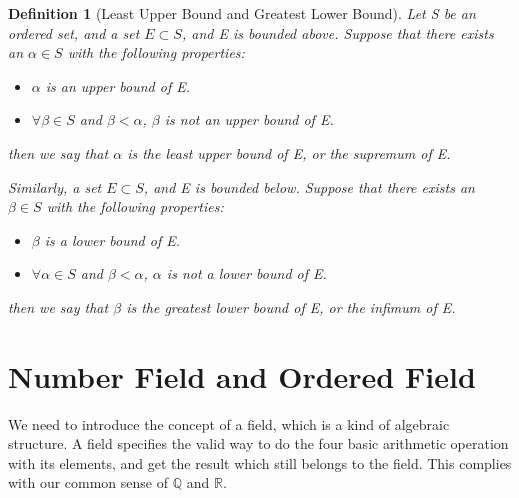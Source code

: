 \documentclass{article}
\newtheorem{definition}{Definition}[section]
\begin{document}
\begin{definition}[Least Upper Bound and Greatest Lower Bound]
  Let S be an ordered set, and a set $E \subset S$, and E is bounded above. 
  Suppose that there exists an $\alpha \in S$ with the following properties:
  \begin{itemize}
    \item $\alpha$ is an upper bound of E.
    \item $\forall \beta \in S$ and $\beta < \alpha$, $\beta$ is not an upper 
    bound of E.
  \end{itemize}
  then we say that $\alpha$ is the least upper bound of E, or the supremum of E.
  
  Similarly, a set $E \subset S$, and E is bounded below. Suppose that there 
  exists an $\beta \in S$ with the following properties:
  \begin{itemize}
    \item $\beta$ is a lower bound of E.
    \item $\forall \alpha \in S$ and $\beta < \alpha$, $\alpha$ is not a lower 
    bound of E.
  \end{itemize}
  then we say that $\beta$ is the greatest lower bound of E, or the infimum of E.
\end{definition}

\section{Number Field and Ordered Field}

We need to introduce the concept of a field, which is a kind of algebraic 
structure. A field specifies the valid way to do the four basic arithmetic 
operation with its elements, and get the result which still belongs to the 
field. This complies with our common sense of $\mathbb{Q}$ and $\mathbb{R}$.
\end{document}
